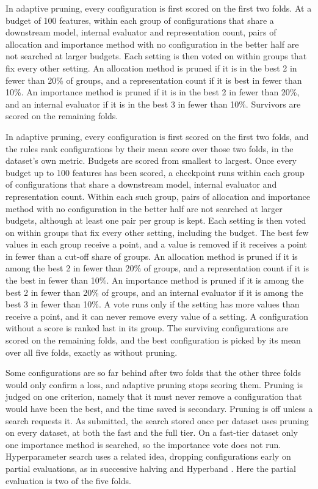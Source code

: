 In adaptive pruning, every configuration is first scored on the first two folds. At a budget of 100 features, within each group of configurations that share a downstream model, internal evaluator and representation count, pairs of allocation and importance method with no configuration in the better half are not searched at larger budgets. Each setting is then voted on within groups that fix every other setting. An allocation method is pruned if it is in the best 2 in fewer than 20\% of groups, and a representation count if it is best in fewer than 10\%. An importance method is pruned if it is in the best 2 in fewer than 20\%, and an internal evaluator if it is in the best 3 in fewer than 10\%. Survivors are scored on the remaining folds.

In adaptive pruning, every configuration is first scored on the first two folds, and the rules rank configurations by their mean score over those two folds, in the dataset's own metric. Budgets are scored from smallest to largest. Once every budget up to 100 features has been scored, a checkpoint runs within each group of configurations that share a downstream model, internal evaluator and representation count. Within each such group, pairs of allocation and importance method with no configuration in the better half are not searched at larger budgets, although at least one pair per group is kept. Each setting is then voted on within groups that fix every other setting, including the budget. The best few values in each group receive a point, and a value is removed if it receives a point in fewer than a cut-off share of groups. An allocation method is pruned if it is among the best 2 in fewer than 20\% of groups, and a representation count if it is the best in fewer than 10\%. An importance method is pruned if it is among the best 2 in fewer than 20\% of groups, and an internal evaluator if it is among the best 3 in fewer than 10\%. A vote runs only if the setting has more values than receive a point, and it can never remove every value of a setting. A configuration without a score is ranked last in its group. The surviving configurations are scored on the remaining folds, and the best configuration is picked by its mean over all five folds, exactly as without pruning.

Some configurations are so far behind after two folds that the other three folds would only confirm a loss, and adaptive pruning stops scoring them. Pruning is judged on one criterion, namely that it must never remove a configuration that would have been the best, and the time saved is secondary. Pruning is off unless a search requests it. As submitted, the search stored once per dataset uses pruning on every dataset, at both the fast and the full tier. On a fast-tier dataset only one importance method is searched, so the importance vote does not run. Hyperparameter search uses a related idea, dropping configurations early on partial evaluations, as in successive halving \citep{Jamieson2016} and Hyperband \citep{Li2018Hyperband}. Here the partial evaluation is two of the five folds.

